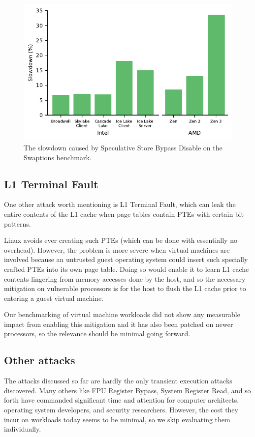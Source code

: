 \begin{figure}[h]
  \includegraphics[width=\columnwidth]{plots/ssbd.pdf}
  \caption{The slowdown caused by Speculative Store Bypass Disable on the Swaptions benchmark.}
  \label{fig:ssbd}
\end{figure}

\subsection{L1 Terminal Fault}
One other attack worth mentioning is L1 Terminal Fault, which can leak the entire contents of the L1 cache when page tables contain PTEs with certain bit patterns.

Linux avoids ever creating such PTEs (which can be done with essentially no overhead).
However, the problem is more severe when virtual machines are involved because an untrusted guest operating system could insert such specially crafted PTEs into its own page table.
Doing so would enable it to learn L1 cache contents lingering from memory accesses done by the host, and so the necessary mitigation on vulnerable processors is for the host to flush the L1 cache prior to entering a guest virtual machine.

Our benchmarking of virtual machine workloads did not show any measurable impact from enabling this mitigation and it has also been patched on newer processors, so the relevance should be minimal going forward.

\subsection{Other attacks}

The attacks discussed so far are hardly the only transient execution attacks discovered.
Many others like FPU Register Bypass, System Register Read, and so forth have commanded significant time and attention for computer architects, operating system developers, and security researchers.
However, the cost they incur on workloads today seems to be minimal, so we skip evaluating them individually.
